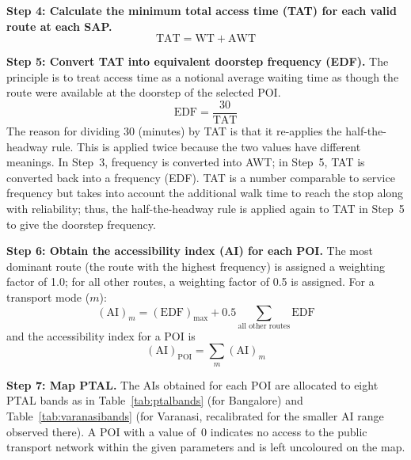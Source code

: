 \documentclass[11pt]{article}
\begin{document}
\textbf{Step 4: Calculate the minimum total access time (TAT) for each valid route at each
SAP.}
\begin{equation}
\text{TAT} = \text{WT} + \text{AWT}
\end{equation}

\textbf{Step 5: Convert TAT into equivalent doorstep frequency (EDF).} The principle is to
treat access time as a notional average waiting time as though the route were available at the
doorstep of the selected POI.
\begin{equation}
\text{EDF} = \frac{30}{\text{TAT}}
\end{equation}
The reason for dividing 30 (minutes) by TAT is that it re-applies the half-the-headway rule.
This is applied twice because the two values have different meanings. In Step~3, frequency is
converted into AWT; in Step~5, TAT is converted back into a frequency (EDF). TAT is a number
comparable to service frequency but takes into account the additional walk time to reach the
stop along with reliability; thus, the half-the-headway rule is applied again to TAT in Step~5 to
give the doorstep frequency.

\textbf{Step 6: Obtain the accessibility index (AI) for each POI.} The most dominant route
(the route with the highest frequency) is assigned a weighting factor of 1.0; for all other
routes, a weighting factor of 0.5 is assigned. For a transport mode ($m$):
\begin{equation}
(\text{AI})_m = (\text{EDF})_{\max} + 0.5 \sum_{\text{all other routes}} \text{EDF}
\end{equation}
and the accessibility index for a POI is
\begin{equation}
(\text{AI})_{\text{POI}} = \sum_m (\text{AI})_m
\end{equation}

\textbf{Step 7: Map PTAL.} The AIs obtained for each POI are allocated to eight PTAL bands as
in Table~\ref{tab:ptalbands} (for Bangalore) and Table~\ref{tab:varanasibands} (for Varanasi,
recalibrated for the smaller AI range observed there). A POI with a value of~0 indicates no
access to the public transport network within the given parameters and is left uncoloured on the
map.
\end{document}
